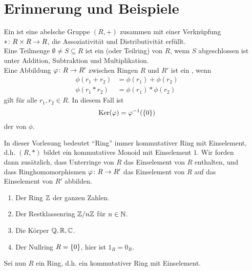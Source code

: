 \section{Erinnerung und Beispiele}

\begin{erinnerung}
	Ein  ist eine abelsche Gruppe $(R, +)$ zusammen mit einer Verknüpfung $* \colon R \times R \to R$, die Assoziativität und Distributivität erfüllt. \\
	Eine Teilmenge $\emptyset \neq S \subseteq R$ ist ein  (oder Teilring) von $R$, wenn $S$ abgeschlossen ist unter Addition, Subtraktion und Multiplikation. \\
	Eine Abbildung $\varphi \colon R \to R'$ zwischen Ringen $R$ und $R'$ ist ein , wenn
	\begin{align*}
		\phi ( r_1 + r_2 ) &= \phi(r_1) + \phi(r_2) \\
		\phi ( r_1 * r_2 ) &= \phi(r_1) * \phi(r_2)
	\end{align*}
	gilt für alle $r_1, r_2 \in R$. In diesem Fall ist 
	\begin{align*}
		\operatorname{Ker}(\varphi) = \varphi^{-1}(\{ 0 \})
	\end{align*}
	der  von $\phi$.
\end{erinnerung}

\begin{bem}
	In dieser Vorlesung bedeutet ``Ring'' immer kommutativer Ring mit Einselement, d.h. $(R,*)$ bildet ein kommutatives Monoid mit Einselement $1$. Wir forden dann zusätzlich, dass Unterringe von $R$ das Einselement von $R$ enthalten, und dass Ringhomomorphismen $\varphi \colon R \to R'$ das Einselement von $R$ auf das Einselement von $R'$ abbilden.
\end{bem}

\begin{bsp}
	\begin{enumerate}
		\item Der Ring $\mathbb{Z}$ der ganzen Zahlen.
		\item Der Restklassenring $\mathbb{Z} / n \mathbb{Z}$ für $n \in \mathbb{N}$.
		\item Die Körper $\mathbb{Q}, \mathbb{R}, \mathbb{C}$.
		\item Der Nullring $R = \{ 0 \}$, hier ist $1_R = 0_R$.
	\end{enumerate}
\end{bsp}

Sei nun $R$ ein Ring, d.h. ein kommutativer Ring mit Einselement.


